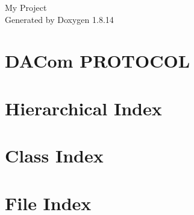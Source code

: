 \documentclass[twoside]{book}
\newcommand{\+}{\discretionary{\mbox{\scriptsize$\hookleftarrow$}}{}{}}
\newcommand{\clearemptydoublepage}{%
  \newpage{\pagestyle{empty}\cleardoublepage}%
}
\begin{document}
\hypersetup{pageanchor=false,
             bookmarksnumbered=true,
             pdfencoding=unicode
            }
\begin{titlepage}
\vspace*{7cm}
\begin{center}%
{\Large My Project }\\
\vspace*{1cm}
{\large Generated by Doxygen 1.8.14}\\
\end{center}
\end{titlepage}
\clearemptydoublepage
{}
\tableofcontents
\clearemptydoublepage
{}
\hypersetup{pageanchor=true}

\chapter{D\+A\+Com P\+R\+O\+T\+O\+C\+OL}
\label{md__r_e_a_d_m_e}

\chapter{Hierarchical Index}

\chapter{Class Index}

\chapter{File Index}

\end{document}
